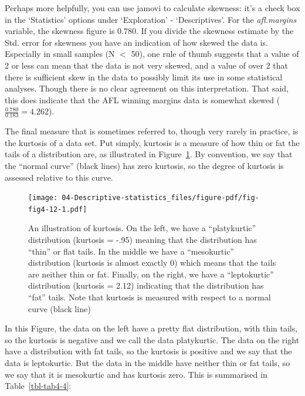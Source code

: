 \documentclass[
  a4paper,
]{book}
\begin{document}
Perhaps more helpfully, you can use jamovi to calculate skewness: it's a
check box in the `Statistics' options under `Exploration' -
`Descriptives'. For the \emph{afl.margins} variable, the skewness figure
is \(0.780\). If you divide the skewness estimate by the Std. error for
skewness you have an indication of how skewed the data is. Especially in
small samples (N \(<\) 50), one rule of thumb suggests that a value of 2
or less can mean that the data is not very skewed, and a value of over 2
that there is sufficient skew in the data to possibly limit its use in
some statistical analyses. Though there is no clear agreement on this
interpretation. That said, this does indicate that the AFL winning
margins data is somewhat skewed (\(\frac{0.780}{0.183} = 4.262\)).

The final measure that is sometimes referred to, though very rarely in
practice, is the kurtosis of a data set. Put simply, kurtosis is a
measure of how thin or fat the tails of a distribution are, as
illustrated in Figure~\ref{fig-fig4-12}. By convention, we say that the
``normal curve'' (black lines) has zero kurtosis, so the degree of
kurtosis is assessed relative to this curve.

\begin{figure}

\texttt{[image: 04-Descriptive-statistics\_files/figure-pdf/fig-fig4-12-1.pdf]} \hfill{}

\caption{\label{fig-fig4-12}An illustration of kurtosis. On the left, we
have a ``platykurtic'' distribution (kurtosis = -.95) meaning that the
distribution has ``thin'' or flat tails. In the middle we have a
``mesokurtic'' distribution (kurtosis is almost exactly 0) which means
that the tails are neither thin or fat. Finally, on the right, we have a
``leptokurtic'' distribution (kurtosis = 2.12) indicating that the
distribution has ``fat'' tails. Note that kurtosis is measured with
respect to a normal curve (black line)}

\end{figure}

In this Figure, the data on the left have a pretty flat distribution,
with thin tails, so the kurtosis is negative and we call the data
platykurtic. The data on the right have a distribution with fat tails,
so the kurtosis is positive and we say that the data is leptokurtic. But
the data in the middle have neither thin or fat tails, so we say that it
is mesokurtic and has kurtosis zero. This is summarised in
Table~\ref{tbl-tab4-4}:
\end{document}
